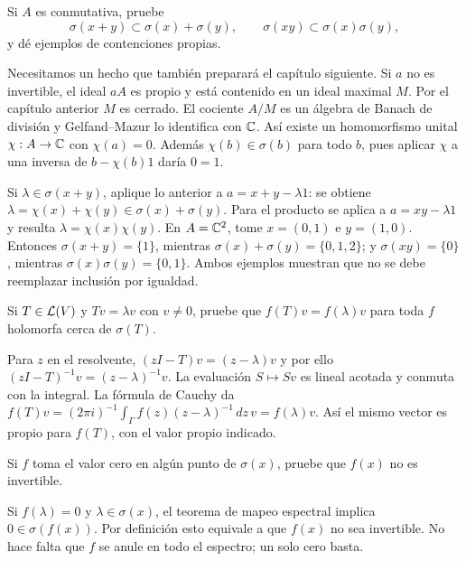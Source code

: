 \begin{ejercicio}\label{ej:v3-l22-6}
Si $A$ es conmutativa, pruebe
\[
 \sigma(x+y)\subset\sigma(x)+\sigma(y),\qquad
 \sigma(xy)\subset\sigma(x)\sigma(y),
\]
y dé ejemplos de contenciones propias.
\end{ejercicio}
\begin{solucion}
Necesitamos un hecho que también preparará el capítulo siguiente. Si $a$ no es invertible, el ideal $aA$ es propio y está contenido en un ideal maximal $M$. Por el capítulo anterior $M$ es cerrado. El cociente $A/M$ es un álgebra de Banach de división y Gelfand--Mazur lo identifica con $\mathbb C$. Así existe un homomorfismo unital $\chi:A\to\mathbb C$ con $\chi(a)=0$. Además $\chi(b)\in\sigma(b)$ para todo $b$, pues aplicar $\chi$ a una inversa de $b-\chi(b)1$ daría $0=1$.

Si $\lambda\in\sigma(x+y)$, aplique lo anterior a $a=x+y-\lambda1$: se obtiene $\lambda=\chi(x)+\chi(y)\in\sigma(x)+\sigma(y)$. Para el producto se aplica a $a=xy-\lambda1$ y resulta $\lambda=\chi(x)\chi(y)$. En $A=\mathbb C^2$, tome $x=(0,1)$ e $y=(1,0)$. Entonces $\sigma(x+y)=\{1\}$, mientras $\sigma(x)+\sigma(y)=\{0,1,2\}$; y $\sigma(xy)=\{0\}$, mientras $\sigma(x)\sigma(y)=\{0,1\}$. Ambos ejemplos muestran que no se debe reemplazar inclusión por igualdad.
\end{solucion}

\begin{ejercicio}\label{ej:v3-l23-1}
Si $T\in\mathcal L(V)$ y $Tv=\lambda v$ con $v\ne0$, pruebe que $f(T)v=f(\lambda)v$ para toda $f$ holomorfa cerca de $\sigma(T)$.
\end{ejercicio}
\begin{solucion}
Para $z$ en el resolvente, $(zI-T)v=(z-\lambda)v$ y por ello $(zI-T)^{-1}v=(z-\lambda)^{-1}v$. La evaluación $S\mapsto Sv$ es lineal acotada y conmuta con la integral. La fórmula de Cauchy da
$f(T)v=(2\pi i)^{-1}\int_\Gamma f(z)(z-\lambda)^{-1}\,dz\,v=f(\lambda)v$. Así el mismo vector es propio para $f(T)$, con el valor propio indicado.
\end{solucion}

\begin{ejercicio}\label{ej:v3-l23-2}
Si $f$ toma el valor cero en algún punto de $\sigma(x)$, pruebe que $f(x)$ no es invertible.
\end{ejercicio}
\begin{solucion}
Si $f(\lambda)=0$ y $\lambda\in\sigma(x)$, el teorema de mapeo espectral implica $0\in\sigma(f(x))$. Por definición esto equivale a que $f(x)$ no sea invertible. No hace falta que $f$ se anule en todo el espectro; un solo cero basta.
\end{solucion}

